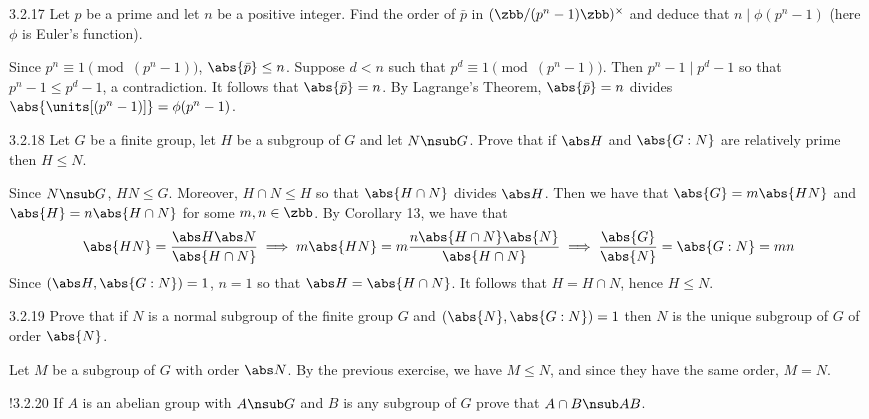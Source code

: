 \begin{exercise}{3.2.17}
    Let $p$ be a prime and let $n$ be a positive integer.
	Find the order of $\bar p$ in $(\zbb/(p^n - 1)\zbb)^\times$ and deduce that $n \mid \phi(p^n - 1)$ (here $\phi$ is Euler's function).
\end{exercise}

\begin{sol}
    Since $p^n \equiv 1 \pmod (p^n - 1)$, $\abs{\bar p} \leq n$.
	Suppose $d < n$ such that $p^d \equiv 1 \pmod (p^n - 1)$.
	Then $p^n - 1 \mid p^d - 1$ so that $p^n - 1 \leq p^d - 1$, a contradiction.
	It follows that $\abs{\bar p} = n$.
	By Lagrange's Theorem, $\abs{\bar p} = n$ divides $\abs{\units[(p^n - 1)]} = \phi(p^n - 1)$.
\end{sol}

\begin{exercise}{3.2.18}
    Let $G$ be a finite group, let $H$ be a subgroup of $G$ and let $N \nsub G$.
	Prove that if $\abs H$ and $\abs{G : N}$ are relatively prime then $H \leq N$.
\end{exercise}

\begin{sol}
    Since $N \nsub G$, $HN \leq G$.
	Moreover, $H \cap N \leq H$ so that $\abs{H \cap N}$ divides $\abs H$.
	Then we have that $\abs{G} = m\abs{HN}$ and $\abs{H} = n\abs{H \cap N}$ for some $m, n \in \zbb$.
	By Corollary 13, we have that
    \[
    	\abs{HN} = \frac{\abs H \abs N}{\abs{H \cap N}} \implies m\abs{HN} = m\frac{n\abs{H \cap N}\abs{N}}{\abs{H \cap N}} \implies \frac{\abs{G}}{\abs{N}} = \abs{G : N} = mn
    \]
    Since $(\abs H, \abs{G : N}) = 1$, $n = 1$ so that $\abs H = \abs{H \cap N}$.
	It follows that $H = H \cap N$, hence $H \leq N$.
\end{sol}

\begin{exercise}{3.2.19}
    Prove that if $N$ is a normal subgroup of the finite group $G$ and $(\abs{N}, \abs{G : N}) = 1$ then $N$ is the unique subgroup of $G$ of order $\abs{N}$.
\end{exercise}

\begin{sol}
    Let $M$ be a subgroup of $G$ with order $\abs N$.
	By the previous exercise, we have $M \leq N$, and since they have the same order, $M = N$.
\end{sol}

\begin{exercise}!{3.2.20}
    If $A$ is an abelian group with $A \nsub G$ and $B$ is any subgroup of $G$ prove that $A \cap B \nsub AB$.
\end{exercise}

